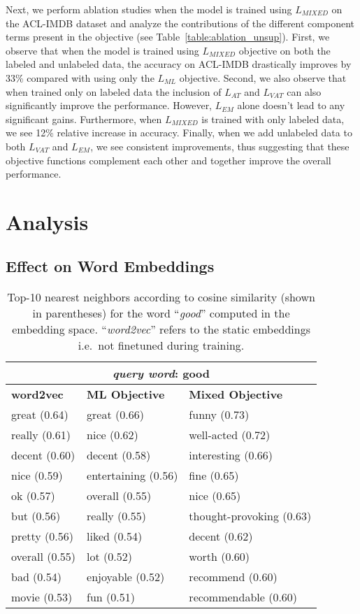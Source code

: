 \documentclass[letterpaper]{article}
\begin{document}
Next, we perform ablation studies when the model is trained using $L_{\textit{MIXED}}$ on the ACL-IMDB dataset and analyze the contributions of the different component terms present in the objective (see Table~\ref{table:ablation_unsup}). First, we observe that when the model is trained using $L_{\textit{MIXED}}$ objective on both the labeled and unlabeled data, the accuracy on ACL-IMDB drastically improves by 33\% compared with using only the $L_{\textit{ML}}$ objective. Second, we also observe that when trained only on labeled data the inclusion of $L_{\textit{AT}}$ and $L_{\textit{VAT}}$ can also significantly improve the performance. However, $L_{\textit{EM}}$ alone doesn't lead to any significant gains. Furthermore, when $L_{\textit{MIXED}}$ is trained with only labeled data, we see 12\% relative increase in accuracy. Finally, when we add unlabeled data to both $L_{\textit{VAT}}$ and $L_{\textit{EM}}$, we see consistent improvements, thus suggesting that these objective functions complement each other and together improve the overall performance.

\section{Analysis}                        \label{sec:analysis}

\subsection{Effect on Word Embeddings}
\begin{table}[!htb]
\small
\centering
\begin{tabular}{@{}l | l | l@{}} 
\toprule
\multicolumn{3}{c}{\emph{query word}: good} \\
\midrule
\textbf{word2vec} & \textbf{ML Objective} & \textbf{Mixed Objective} \\ 
\midrule
great (0.64) & great (0.66) & funny (0.73) \\
really (0.61) & nice (0.62) & well-acted (0.72) \\
decent (0.60) & decent (0.58) & interesting (0.66) \\
nice (0.59) & entertaining (0.56) & fine (0.65) \\
ok (0.57) & overall (0.55) & nice (0.65) \\
but (0.56) & really (0.55) & thought-provoking (0.63) \\
pretty (0.56) & liked (0.54) & decent (0.62) \\
overall (0.55) & lot (0.52) & worth (0.60) \\
bad (0.54) & enjoyable (0.52) & recommend (0.60) \\
movie (0.53) & fun (0.51) & recommendable (0.60) \\
\bottomrule
\end{tabular}
\caption{Top-10 nearest neighbors according to cosine similarity (shown in parentheses) for the word ``\emph{good}'' computed in the embedding space. ``\emph{word2vec}'' refers to the static embeddings i.e.\ not finetuned during training.}
\label{table:t-sne}
\end{table}
\end{document}
